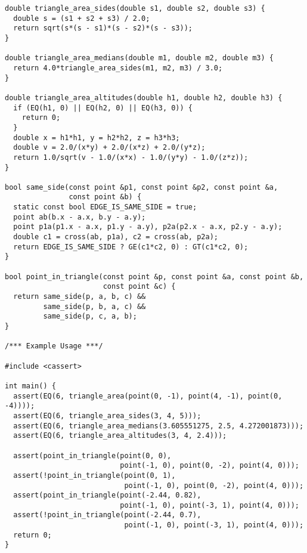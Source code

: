 \begin{lstlisting}
double triangle_area_sides(double s1, double s2, double s3) {
  double s = (s1 + s2 + s3) / 2.0;
  return sqrt(s*(s - s1)*(s - s2)*(s - s3));
}

double triangle_area_medians(double m1, double m2, double m3) {
  return 4.0*triangle_area_sides(m1, m2, m3) / 3.0;
}

double triangle_area_altitudes(double h1, double h2, double h3) {
  if (EQ(h1, 0) || EQ(h2, 0) || EQ(h3, 0)) {
    return 0;
  }
  double x = h1*h1, y = h2*h2, z = h3*h3;
  double v = 2.0/(x*y) + 2.0/(x*z) + 2.0/(y*z);
  return 1.0/sqrt(v - 1.0/(x*x) - 1.0/(y*y) - 1.0/(z*z));
}

bool same_side(const point &p1, const point &p2, const point &a,
               const point &b) {
  static const bool EDGE_IS_SAME_SIDE = true;
  point ab(b.x - a.x, b.y - a.y);
  point p1a(p1.x - a.x, p1.y - a.y), p2a(p2.x - a.x, p2.y - a.y);
  double c1 = cross(ab, p1a), c2 = cross(ab, p2a);
  return EDGE_IS_SAME_SIDE ? GE(c1*c2, 0) : GT(c1*c2, 0);
}

bool point_in_triangle(const point &p, const point &a, const point &b,
                       const point &c) {
  return same_side(p, a, b, c) &&
         same_side(p, b, a, c) &&
         same_side(p, c, a, b);
}

/*** Example Usage ***/

#include <cassert>

int main() {
  assert(EQ(6, triangle_area(point(0, -1), point(4, -1), point(0, -4))));
  assert(EQ(6, triangle_area_sides(3, 4, 5)));
  assert(EQ(6, triangle_area_medians(3.605551275, 2.5, 4.272001873)));
  assert(EQ(6, triangle_area_altitudes(3, 4, 2.4)));

  assert(point_in_triangle(point(0, 0),
                           point(-1, 0), point(0, -2), point(4, 0)));
  assert(!point_in_triangle(point(0, 1),
                            point(-1, 0), point(0, -2), point(4, 0)));
  assert(point_in_triangle(point(-2.44, 0.82),
                           point(-1, 0), point(-3, 1), point(4, 0)));
  assert(!point_in_triangle(point(-2.44, 0.7),
                            point(-1, 0), point(-3, 1), point(4, 0)));
  return 0;
}
\end{lstlisting}
